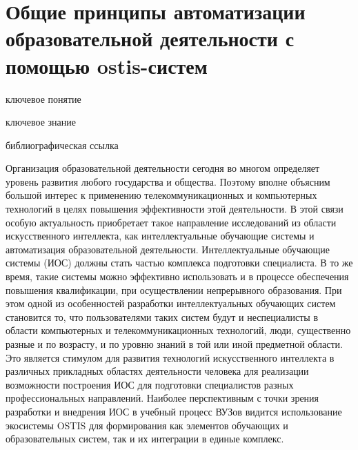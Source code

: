 \section{Общие принципы автоматизации образовательной деятельности с помощью ostis-систем}
\label{sec_general_principles_automation_educational_activities}

\begin{SCn}
	
	\bigskip
	
	\begin{scnrelfromlist}{ключевое понятие}
	\end{scnrelfromlist}
	
	\bigskip
	
	\begin{scnrelfromlist}{ключевое знание}
	\end{scnrelfromlist}
	
	\bigskip
	
	\begin{scnrelfromlist}{библиографическая ссылка}
	\end{scnrelfromlist}
	
\end{SCn}

Организация образовательной деятельности сегодня во многом определяет уровень развития любого государства и общества. Поэтому вполне объясним большой интерес к применению телекоммуникационных и компьютерных технологий в целях повышения эффективности этой деятельности. В этой связи особую актуальность приобретает такое направление исследований из области искусственного интеллекта, как интеллектуальные обучающие системы и автоматизация образовательной деятельности. Интеллектуальные обучающие системы (ИОС) должны стать частью комплекса подготовки специалиста. В то же время, такие системы можно эффективно использовать и в процессе обеспечения повышения квалификации, при осуществлении непрерывного образования. При этом одной из особенностей разработки интеллектуальных обучающих систем становится то, что пользователями таких систем будут и неспециалисты в области компьютерных и телекоммуникационных технологий, люди, существенно разные и по возрасту, и по уровню знаний в той или иной предметной области. Это является стимулом для развития технологий искусственного интеллекта в различных прикладных областях деятельности человека для реализации возможности построения ИОС для подготовки специалистов разных профессиональных направлений. Наиболее перспективным с точки зрения разработки и внедрения ИОС в учебный процесс ВУЗов видится использование экосистемы OSTIS для формирования как элементов обучающих и образовательных систем, так и их интеграции в единые комплекс.

